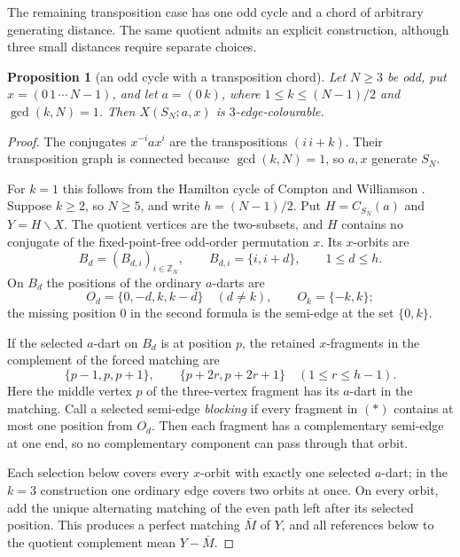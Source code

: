\documentclass[11pt,a4paper]{article}
\newtheorem{proposition}[theorem]{Proposition}
\theoremstyle{definition}
\theoremstyle{remark}
\newcommand{\ZZ}{\mathbb{Z}}
\newcommand{\X}[3]{X(#1;#2,#3)}
\begin{document}
The remaining transposition case has one odd cycle and a chord of arbitrary generating distance.  The same quotient admits an explicit construction, although three small distances require separate choices.
\begin{proposition}[an odd cycle with a transposition chord]\label{prop:odd-cycle-chord}
Let $N\ge3$ be odd, put $x=(0\,1\,\cdots\,N-1)$, and let $a=(0\,k)$, where $1\le k\le (N-1)/2$ and $\gcd(k,N)=1$.  Then $\X{S_N}{a}{x}$ is $3$-edge-colourable.
\end{proposition}
\begin{proof}
The conjugates $x^{-i}ax^i$ are the transpositions $(i\,i+k)$.  Their transposition graph is connected because $\gcd(k,N)=1$, so $a,x$ generate $S_N$.

For $k=1$ this follows from the Hamilton cycle of Compton and Williamson \cite{ComptonWilliamson93}.  Suppose $k\ge2$, so $N\ge5$, and write $h=(N-1)/2$.  Put $H=C_{S_N}(a)$ and $Y=H\backslash X$.  The quotient vertices are the two-subsets, and $H$ contains no conjugate of the fixed-point-free odd-order permutation $x$.  Its $x$-orbits are
\[
 B_d=(B_{d,i})_{i\in\ZZ_N},\qquad B_{d,i}=\{i,i+d\},\qquad 1\le d\le h.
\]
On $B_d$ the positions of the ordinary $a$-darts are
\[
 O_d=\{0,-d,k,k-d\}\quad(d\ne k),\qquad O_k=\{-k,k\};
\]
the missing position $0$ in the second formula is the semi-edge at the set $\{0,k\}$.

If the selected $a$-dart on $B_d$ is at position $p$, the retained $x$-fragments in the complement of the forced matching are
\[
 \{p-1,p,p+1\},\qquad
 \{p+2r,p+2r+1\}\quad(1\le r\le h-1).\tag{*}
\]
Here the middle vertex $p$ of the three-vertex fragment has its $a$-dart in the matching.  Call a selected semi-edge \emph{blocking} if every fragment in $(*)$ contains at most one position from $O_d$.  Then each fragment has a complementary semi-edge at one end, so no complementary component can pass through that orbit.

Each selection below covers every $x$-orbit with exactly one selected $a$-dart; in the $k=3$ construction one ordinary edge covers two orbits at once.  On every orbit, add the unique alternating matching of the even path left after its selected position.  This produces a perfect matching $\bar M$ of $Y$, and all references below to the quotient complement mean $Y-\bar M$.


\end{proof}
\end{document}
